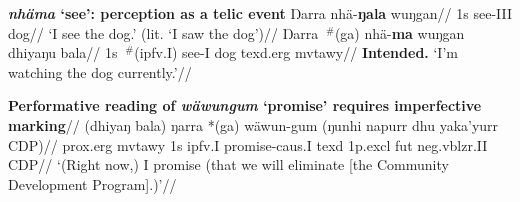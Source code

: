 \pex\textbf{\textit{nhäma} `see': perception as a telic event}
\a\begingl\gla Ŋarra nhä-\textbf{ŋala} wuŋgan//
\glb 1s see-\gls{III} dog//
\glft`I see the dog.' (lit. `I saw the dog')\trailingcitation{[DB~20190405]}//\endgl
\a\begingl\gla Ŋarra $~^\#$(ga) nhä-\textbf{ma} wuŋgan dhiyaŋu bala//
\glb 1s $~^\#$(\gls{ipfv}.\gls{I}) see-\gls{I} dog \gls{texd}.\gls{erg} \gls{mvtawy}//
\glft\textbf{Intended. }`I'm watching the dog currently.'\trailingcitation{[DB~20190405]}//\endgl\xe

\pex\begingl\glpreamble \textbf{Performative reading of \textit{wäwungum} `promise' requires imperfective marking}//
\gla (dhiyaŋ bala) ŋarra *(ga) wäwun-gum (ŋunhi napurr dhu yaka'yurr CDP)//
\glb \gls{prox}.\gls{erg} \gls{mvtawy} 1s \gls{ipfv}.\gls{I} promise-\gls{caus}.\gls{I} \gls{texd} 1p.\gls{excl} \gls{fut} \gls{neg}.\gls{vblzr}.\gls{II} CDP//
\glft`(Right now,) I promise (that we will eliminate [the Community Development Program].)'\trailingcitation{[AW~20190428]}//\endgl\xe
%
%

